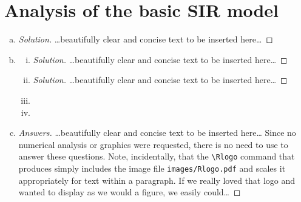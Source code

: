 \documentclass[12pt]{article}
\begin{document}
\section{Analysis of the basic SIR  model}

\basicSIRanalIntro
\begin{enumerate}[(a)]
\item \basicSIRanalQa

{\color{blue}
\begin{proof}[Solution]
{\color{magenta}\dots beautifully clear and concise text to be inserted here\dots}
\end{proof}
}

\item \basicSIRanalQb
  \begin{enumerate}[(i)]
  \item \basicSIRanalQbi

{\color{blue}
\begin{proof}[Solution]
{\color{magenta}\dots beautifully clear and concise text to be inserted here\dots}
\end{proof}
}

 \item \basicSIRanalQbii

{\color{blue}
\begin{proof}[Solution]
{\color{magenta}\dots beautifully clear and concise text to be inserted here\dots}
\end{proof}
}

  \item \basicSIRanalQbiii
  \item \basicSIRanalQbiv
  \end{enumerate}
\item \basicSIRanalQc

{\color{blue}
\begin{proof}[Answers]
{\color{magenta}\dots beautifully clear and concise text to be inserted here\dots}
Since no numerical analysis or graphics were requested, there is no need to use \Rlogo to answer these questions.  Note, incidentally, that the \verb|\Rlogo| command that produces \Rlogo simply includes the image file \texttt{images/Rlogo.pdf} and scales it appropriately for text within a paragraph.  If we really loved that logo and wanted to display as we would a figure, we easily could\dots
\end{proof}
}
\begin{center}
\end{center}


\end{enumerate}
\end{document}
